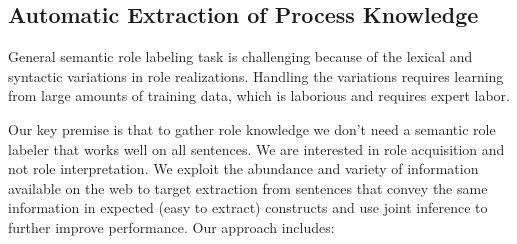 \subsection{Automatic Extraction of Process Knowledge}
General semantic role labeling task is challenging because of the lexical and syntactic variations in role realizations. 
Handling the variations requires learning from large amounts of training data, which is laborious and requires expert labor.

Our key premise is that to gather role knowledge we don't need a semantic role labeler that works well on all sentences. 
We are interested in role acquisition and not role interpretation.
We exploit the abundance and variety of information available on the web to target extraction from 
sentences that convey the same information in expected (easy to extract) constructs and 
use joint inference to further improve performance. Our approach includes:
